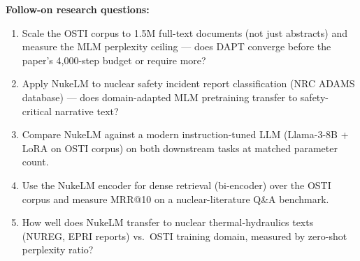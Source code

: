 \noindent\textbf{Follow-on research questions:}
\begin{enumerate}[leftmargin=1.6em,itemsep=0.2em,topsep=0.2em,label=Q\arabic*.]
\item Scale the OSTI corpus to 1.5M full-text documents (not just abstracts) and measure the MLM perplexity ceiling --- does DAPT converge before the paper's 4,000-step budget or require more?
\item Apply NukeLM to nuclear safety incident report classification (NRC ADAMS database) --- does domain-adapted MLM pretraining transfer to safety-critical narrative text?
\item Compare NukeLM against a modern instruction-tuned LLM (Llama-3-8B + LoRA on OSTI corpus) on both downstream tasks at matched parameter count.
\item Use the NukeLM encoder for dense retrieval (bi-encoder) over the OSTI corpus and measure MRR@10 on a nuclear-literature Q\&A benchmark.
\item How well does NukeLM transfer to nuclear thermal-hydraulics texts (NUREG, EPRI reports) vs.\ OSTI training domain, measured by zero-shot perplexity ratio?
\end{enumerate}

